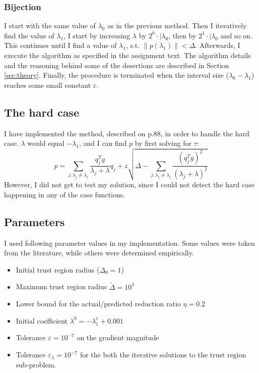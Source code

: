 \documentclass[a4paper]{article}
\begin{document}
\subsubsection{Bijection}
\label{subsubsec:bijection}
I start with the same value of $\lambda_0$ as in the previous method.
Then I iteratively find the value of $\lambda_1$, I start by increasing
$\lambda$ by $2^0 \cdot | \lambda_0$, then by $2^1 \cdot | \lambda_0$ and so on.
This continues until I find a value of $\lambda_1$, s.t.
$\| p(\lambda_1) \| <\Delta$. Afterwards, I execute the algorithm as specified
in the assignment text. The algorithm details and the reasoning behind some of
the desertions are described in Section \ref{sec:theory}. Finally, the procedure is
terminated when the interval size ($\lambda_0 - \lambda_1$) reaches some small
constant $\varepsilon$.

\subsection{The hard case}
I have implemented the method, described on p.88, in order to handle the hard
case. $\lambda$ would equal $-\lambda_1$, and I can find $p$ by first solving for $\tau$:
\[
p=\sum_{j: \lambda_{j} \neq \lambda_{1}} \frac{q_{j}^{T} g}{\lambda_{j}+\lambda}
q_{j} + z\sqrt{\Delta - \sum_{j: \lambda_{j} \neq \lambda_{1}}
  \frac{\left(q_{j}^{T} g\right)^{2}}{\left(\lambda_{j}+\lambda\right)^{2}}}
\]
However, I did not get to test my solution, since I could not detect the hard
case happening in any of the case functions.


\subsection{Parameters}
I used following parameter values in my implementation. Some values were taken
from the literature, while others were determined empirically.
\begin{itemize}
\item Initial trust region radius ($\Delta_0 = 1$)
\item Maximum trust region radius $\tilde{\Delta}=10^3$
\item Lower bound for the actual/predicted reduction ratio $\eta=0.2$
\item Initial coefficient $\lambda^{0}= -\lambda_1^e + 0.001$
\item Tolerance $\varepsilon = 10^{-7}$ on the gradient magnitude
\item Tolerance $\varepsilon_{\lambda} = 10^{-7}$ for the both
  the iterative solutions to the trust region sub-problem.
\end{itemize}
\end{document}
